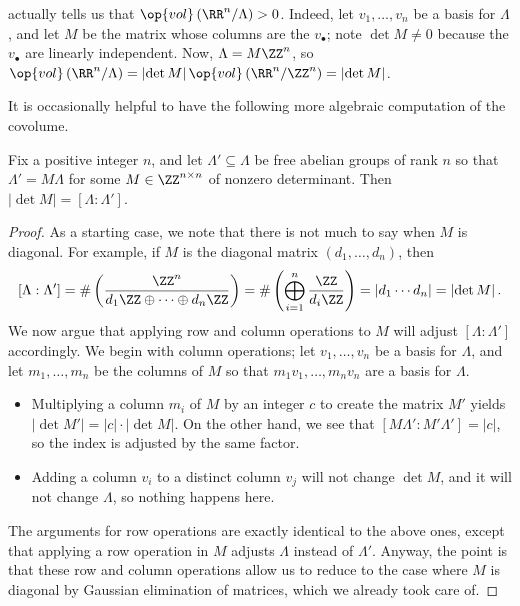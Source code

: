 \documentclass[../notes.tex]{subfiles}
\begin{document}
\begin{remark} \label{rem:compute-covol}
	 actually tells us that $\op{vol}\left(\RR^n/\Lambda\right)>0$. Indeed, let $v_1,\ldots,v_n$ be a basis for $\Lambda$, and let $M$ be the matrix whose columns are the $v_\bullet$; note $\det M\ne0$ because the $v_\bullet$ are linearly independent. Now, $\Lambda=M\ZZ^n$, so $\op{vol}\left(\RR^n/\Lambda\right)=\left|\det M\right|\op{vol}\left(\RR^n/\ZZ^n\right)=\left|\det M\right|$.
\end{remark}
It is occasionally helpful to have the following more algebraic computation of the covolume.
\begin{lemma} \label{lem:lattice-index-is-covol}
	Fix a positive integer $n$, and let $\Lambda'\subseteq\Lambda$ be free abelian groups of rank $n$ so that $\Lambda'=M\Lambda$ for some $M\in\ZZ^{n\times n}$ of nonzero determinant. Then $\left|\det M\right|=[\Lambda:\Lambda']$.
\end{lemma}
\begin{proof}
	As a starting case, we note that there is not much to say when $M$ is diagonal. For example, if $M$ is the diagonal matrix $(d_1,\ldots,d_n)$, then
	\[[\Lambda:\Lambda']=\#\left(\frac{\ZZ^n}{d_1\ZZ\oplus\cdots\oplus d_n\ZZ}\right)=\#\left(\bigoplus_{i=1}^n\frac{\ZZ}{d_i\ZZ}\right)=\left|d_1\cdots d_n\right|=\left|\det M\right|.\]
	We now argue that applying row and column operations to $M$ will adjust $[\Lambda:\Lambda']$ accordingly. We begin with column operations; let $v_1,\ldots,v_n$ be a basis for $\Lambda$, and let $m_1,\ldots,m_n$ be the columns of $M$ so that $m_1v_1,\ldots,m_nv_n$ are a basis for $\Lambda$.
	\begin{itemize}
		\item Multiplying a column $m_i$ of $M$ by an integer $c$ to create the matrix $M'$ yields $\left|\det M'\right|=\left|c\right|\cdot\left|\det M\right|$. On the other hand, we see that $[M\Lambda':M'\Lambda']=\left|c\right|$, so the index is adjusted by the same factor.
		\item Adding a column $v_i$ to a distinct column $v_j$ will not change $\det M$, and it will not change $\Lambda$, so nothing happens here.
	\end{itemize}
	The arguments for row operations are exactly identical to the above ones, except that applying a row operation in $M$ adjusts $\Lambda$ instead of $\Lambda'$. Anyway, the point is that these row and column operations allow us to reduce to the case where $M$ is diagonal by Gaussian elimination of matrices, which we already took care of.
\end{proof}
\end{document}
